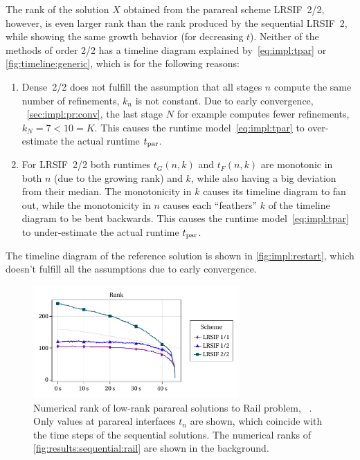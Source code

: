 The rank of the solution $X$ obtained from the parareal scheme \ac{LRSIF}~2/2, however,
is even larger rank than the rank produced by the sequential \ac{LRSIF}~2,
while showing the same growth behavior (for decreasing $t$).
Neither of the methods of order 2/2 has a timeline diagram explained by~\eqref{eq:impl:tpar} or \autoref{fig:timeline:generic},
which is for the following reasons:
\begin{enumerate}[resume]
  \item
    Dense~2/2 does not fulfill the assumption that all stages $n$ compute the same number of refinements,
    \ie $k_n$ is not constant.
    Due to early convergence, \cf~\autoref{sec:impl:pr:conv},
    the last stage $N$ for example computes fewer refinements, $k_N = 7 < 10 = K$.
    This causes the runtime model~\eqref{eq:impl:tpar} to over-estimate the actual runtime $t_\text{par}$.
  \item
    For \ac{LRSIF}~2/2 both runtimes $t_G(n, k)$ and $t_F(n, k)$ are monotonic in both $n$ (due to the growing rank) and $k$,
    while also having a big deviation from their median.
    The monotonicity in $k$ causes its timeline diagram to fan out,
    while the monotonicity in $n$ causes each \enquote{feathers} $k$ of the timeline diagram to be bent backwards.
    This causes the runtime model~\eqref{eq:impl:tpar} to under-estimate the actual runtime $t_\text{par}$.
\end{enumerate}
The timeline diagram of the reference solution is shown in \autoref{fig:impl:restart},
which doesn't fulfill all the assumptions due to early convergence.

\begin{figure}[tp]
  \centering
  \includegraphics[width=0.7\textwidth]{figures/fig_results_parareal_rank.pdf}
  \caption[Numerical rank of low-rank parareal solutions to Rail problem]{%
    Numerical rank of low-rank parareal solutions to Rail problem,
    \cf~\cite[Figure~6.6b]{Lang2017}.
    Only values at parareal interfaces $t_n$ are shown,
    which coincide with the time steps of the sequential solutions.
    The numerical ranks of \autoref{fig:results:sequential:rail} are shown in the background.
  }
  \label{fig:results:parareal:rank}
\end{figure}

